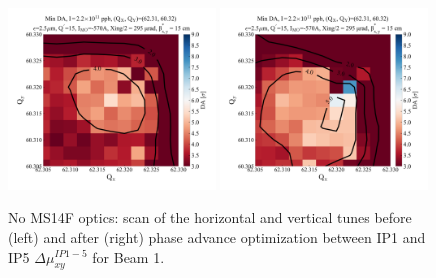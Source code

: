 \documentclass{cernatsnote}
\begin{document}
\begin{figure}[h!]
\centering
\includegraphics[width=0.49\textwidth]{images/q_vs_da_noms14falt_muxy_0.png} \hfill \includegraphics[width=0.49\textwidth]{images/q_vs_da_noms14falt_mux31425_muy30661.png} \\
\caption{\label{da_scan_ms14fms14d} No MS14F optics: scan of the horizontal and vertical tunes before (left) and after (right) phase advance optimization between IP1 and IP5 $\Delta\mu_{xy}^{IP1-5}$ for Beam 1.}
\end{figure}
\end{document}
